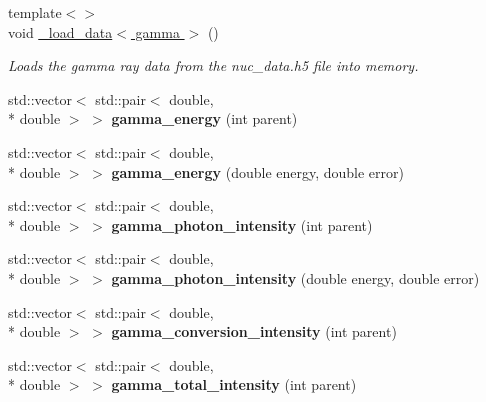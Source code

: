 \begin{DoxyCompactItemize}
\item 
\hypertarget{namespacepyne_af3c61532d2b2c56c5f2a0c1c2777b541}{{\footnotesize template$<$$>$ }\\void \hyperlink{namespacepyne_af3c61532d2b2c56c5f2a0c1c2777b541}{\+\_\+load\+\_\+data$<$ gamma $>$} ()}\label{namespacepyne_af3c61532d2b2c56c5f2a0c1c2777b541}

\begin{DoxyCompactList}\small\item\em Loads the gamma ray data from the nuc\+\_\+data.\+h5 file into memory. \end{DoxyCompactList}\item 
\hypertarget{namespacepyne_a06f0af84c68fa27a8c2b091f1018fbf7}{std\+::vector$<$ std\+::pair$<$ double, \\*
double $>$ $>$ {\bfseries gamma\+\_\+energy} (int parent)}\label{namespacepyne_a06f0af84c68fa27a8c2b091f1018fbf7}

\item 
\hypertarget{namespacepyne_ae9c513347dbf555ae036671b9e606ff3}{std\+::vector$<$ std\+::pair$<$ double, \\*
double $>$ $>$ {\bfseries gamma\+\_\+energy} (double energy, double error)}\label{namespacepyne_ae9c513347dbf555ae036671b9e606ff3}

\item 
\hypertarget{namespacepyne_af6550cdd1953ef1b6765c756cb8dbd8a}{std\+::vector$<$ std\+::pair$<$ double, \\*
double $>$ $>$ {\bfseries gamma\+\_\+photon\+\_\+intensity} (int parent)}\label{namespacepyne_af6550cdd1953ef1b6765c756cb8dbd8a}

\item 
\hypertarget{namespacepyne_aed619424ed24f8e57b0cd1adf5e3cd5e}{std\+::vector$<$ std\+::pair$<$ double, \\*
double $>$ $>$ {\bfseries gamma\+\_\+photon\+\_\+intensity} (double energy, double error)}\label{namespacepyne_aed619424ed24f8e57b0cd1adf5e3cd5e}

\item 
\hypertarget{namespacepyne_aecfb315cfddf396d32d23b0cc5cc1958}{std\+::vector$<$ std\+::pair$<$ double, \\*
double $>$ $>$ {\bfseries gamma\+\_\+conversion\+\_\+intensity} (int parent)}\label{namespacepyne_aecfb315cfddf396d32d23b0cc5cc1958}

\item 
\hypertarget{namespacepyne_af27fabc2e6cae361e977993a84c67ac2}{std\+::vector$<$ std\+::pair$<$ double, \\*
double $>$ $>$ {\bfseries gamma\+\_\+total\+\_\+intensity} (int parent)}\label{namespacepyne_af27fabc2e6cae361e977993a84c67ac2}


\end{DoxyCompactItemize}
